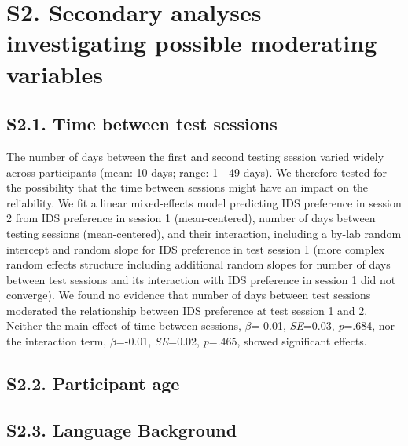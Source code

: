 \documentclass[
  man, donotrepeattitle,floatsintext]{apa6}
\begin{document}
\hypertarget{s2.-secondary-analyses-investigating-possible-moderating-variables}{%
\section{S2. Secondary analyses investigating possible moderating variables}\label{s2.-secondary-analyses-investigating-possible-moderating-variables}}

\hypertarget{s2.1.-time-between-test-sessions}{%
\subsection{S2.1. Time between test sessions}\label{s2.1.-time-between-test-sessions}}

The number of days between the first and second testing session varied widely across participants (mean: 10 days; range: 1 - 49 days). We therefore tested for the possibility that the time between sessions might have an impact on the reliability. We fit a linear mixed-effects model predicting IDS preference in session 2 from IDS preference in session 1 (mean-centered), number of days between testing sessions (mean-centered), and their interaction, including a by-lab random intercept and random slope for IDS preference in test session 1 (more complex random effects structure including additional random slopes for number of days between test sessions and its interaction with IDS preference in session 1 did not converge). We found no evidence that number of days between test sessions moderated the relationship between IDS preference at test session 1 and 2. Neither the main effect of time between sessions, \(\beta\)=-0.01, \emph{SE}=0.03, \emph{p}=.684, nor the interaction term, \(\beta\)=-0.01, \emph{SE}=0.02, \emph{p}=.465, showed significant effects.

\hypertarget{s2.2.-participant-age}{%
\subsection{S2.2. Participant age}\label{s2.2.-participant-age}}

\hypertarget{s2.3.-language-background}{%
\subsection{S2.3. Language Background}\label{s2.3.-language-background}}
\end{document}
